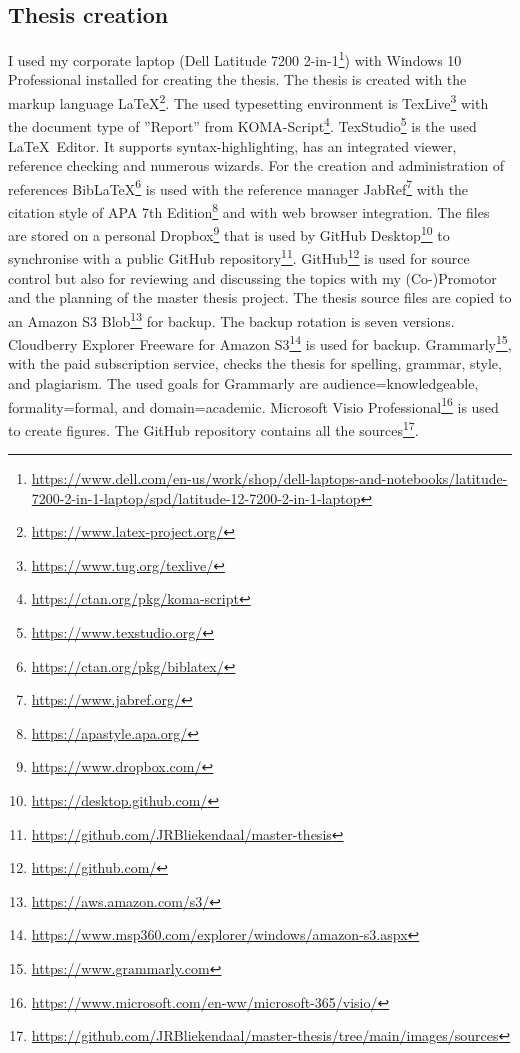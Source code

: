 \subsection{Thesis creation}
\label{sub:tbresearchcreation}
I used my corporate laptop (Dell Latitude 7200 2-in-1\footnote{\url{https://www.dell.com/en-us/work/shop/dell-laptops-and-notebooks/latitude-7200-2-in-1-laptop/spd/latitude-12-7200-2-in-1-laptop}}) with Windows 10 Professional installed for creating the thesis. The thesis is created with the markup language \LaTeX\footnote{\url{https://www.latex-project.org/}}. The used typesetting environment is TexLive\footnote{\url{https://www.tug.org/texlive/}} with the document type of ''Report'' from KOMA-Script\footnote{\url{https://ctan.org/pkg/koma-script}}. TexStudio\footnote{\url{https://www.texstudio.org/}} is the used \LaTeX\ Editor. It supports syntax-highlighting, has an integrated viewer, reference checking and numerous wizards. For the creation and administration of references Bib\LaTeX\footnote{\url{https://ctan.org/pkg/biblatex/}} is used with the reference manager JabRef\footnote{\url{https://www.jabref.org/}} with the citation style of APA 7th Edition\footnote{\url{https://apastyle.apa.org/}} and with web browser integration. The files are stored on a personal Dropbox\footnote{\url{https://www.dropbox.com/}} that is used by GitHub Desktop\footnote{\url{https://desktop.github.com/}} to synchronise with a public GitHub repository\footnote{\url{https://github.com/JRBliekendaal/master-thesis}}. GitHub\footnote{\url{https://github.com/}} is used for source control but also for reviewing and discussing the topics with my (Co-)Promotor and the planning of the master thesis project. The thesis source files are copied to an Amazon S3 Blob\footnote{\url{https://aws.amazon.com/s3/}} for backup. The backup rotation is seven versions. Cloudberry Explorer Freeware for Amazon S3\footnote{\url{https://www.msp360.com/explorer/windows/amazon-s3.aspx}} is used for backup. Grammarly\footnote{\url{https://www.grammarly.com}}, with the paid subscription service, checks the thesis for spelling, grammar,  style, and plagiarism. The used goals for Grammarly are audience=knowledgeable, formality=formal, and domain=academic. Microsoft Visio Professional\footnote{\url{https://www.microsoft.com/en-ww/microsoft-365/visio/}} is used to create figures. The GitHub repository contains all the sources\footnote{\url{https://github.com/JRBliekendaal/master-thesis/tree/main/images/sources}}.
